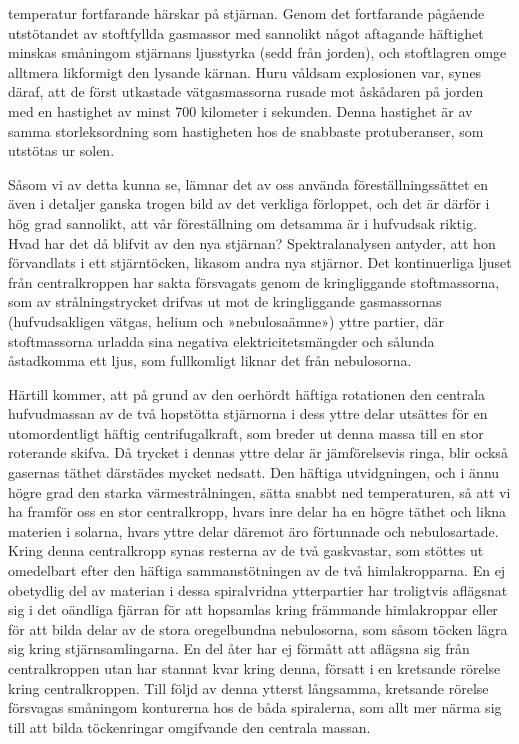 \documentclass[a4paper, 12pt, oneside, swedish]{article}
\begin{document}
temperatur fortfarande härskar på stjärnan. Genom det fortfarande pågående utstötandet av stoftfyllda gasmassor med sannolikt något aftagande häftighet minskas småningom stjärnans ljusstyrka (sedd från jorden), och stoftlagren omge alltmera likformigt den lysande kärnan. Huru våldsam explosionen var, synes däraf, att de först utkastade vätgasmassorna rusade mot åskådaren på jorden med en hastighet av minst 700 kilometer i sekunden. Denna hastighet är av samma storleksordning som hastigheten hos de snabbaste protuberanser, som utstötas ur solen.

Såsom vi av detta kunna se, lämnar det av oss använda föreställningssättet en även i detaljer ganska trogen bild av det verkliga förloppet, och det är därför i hög grad sannolikt, att vår föreställning om detsamma är i hufvudsak riktig. Hvad har det då blifvit av den nya stjärnan? Spektralanalysen antyder, att hon förvandlats i ett stjärntöcken, likasom andra nya stjärnor. Det kontinuerliga ljuset från centralkroppen har sakta försvagats genom de kringliggande stoftmassorna, som av strålningstrycket drifvas ut mot de kringliggande gasmassornas (hufvudsakligen vätgas, helium och »nebulosaämne») yttre partier, där stoftmassorna urladda sina negativa elektricitetsmängder och sålunda åstadkomma ett ljus, som fullkomligt liknar det från nebulosorna.

Härtill kommer, att på grund av den oerhördt häftiga rotationen den centrala hufvudmassan av de två hopstötta stjärnorna i dess yttre delar utsättes för en utomordentligt häftig centrifugalkraft, som breder ut denna massa till en stor roterande skifva. Då trycket i dennas yttre delar är jämförelsevis ringa, blir också gasernas täthet därstädes mycket nedsatt. Den häftiga utvidgningen, och i ännu högre grad den starka värmestrålningen, sätta snabbt ned temperaturen, så att vi ha framför oss en stor centralkropp, hvars inre delar ha en högre täthet och likna materien i solarna, hvars yttre delar däremot äro förtunnade och nebulosartade. Kring denna centralkropp synas resterna av de två gaskvastar, som stöttes ut omedelbart efter den häftiga sammanstötningen av de två himlakropparna. En ej obetydlig del av materian i dessa spiralvridna ytterpartier har troligtvis aflägsnat sig i det oändliga fjärran för att hopsamlas kring främmande himlakroppar eller för att bilda delar av de stora oregelbundna nebulosorna, som såsom töcken lägra sig kring stjärnsamlingarna. En del åter har ej förmått att aflägsna sig från centralkroppen utan har stannat kvar kring denna, försatt i en kretsande rörelse kring centralkroppen. Till följd av denna ytterst långsamma, kretsande rörelse försvagas småningom konturerna hos de båda spiralerna, som allt mer närma sig till att bilda töckenringar omgifvande den centrala massan.
\end{document}
